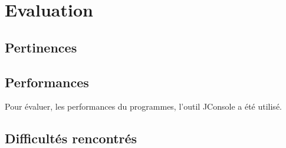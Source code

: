 \section{Evaluation}
	\subsection{Pertinences}
	\subsection{Performances}
	Pour évaluer, les performances du programmes, l'outil JConsole a été utilisé.
	

\subsection{Difficultés rencontrés}
	
	